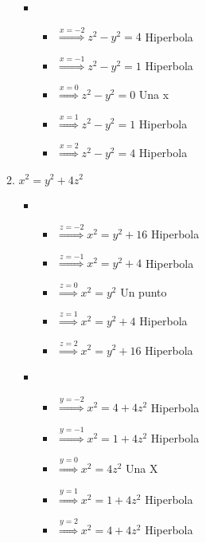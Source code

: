 \documentclass[../practica_02.tex]{subfiles}
\begin{document}
\begin{enumerate}
\begin{enumerate}
\begin{itemize}
                        \item
                            \begin{itemize}
                                \item $\stackrel{x=-2}{\Rightarrow} z^2 - y^2 = 4 $ Hiperbola
                                \item $\stackrel{x=-1}{\Rightarrow} z^2 - y^2 = 1 $ Hiperbola
                                \item $\stackrel{x=0}{\Rightarrow}  z^2 - y^2 = 0 $ Una x
                                \item $\stackrel{x=1}{\Rightarrow}  z^2 - y^2 = 1 $ Hiperbola
                                \item $\stackrel{x=2}{\Rightarrow}  z^2 - y^2 = 4 $ Hiperbola
                            \end{itemize}

                    \end{itemize}

                \item $x^2 = y^2 + 4z^2$

                    \begin{itemize}
                        \item
                            \begin{itemize}
                                \item $\stackrel{z=-2}{\Rightarrow}  x^2 = y^2 + 16 $ Hiperbola
                                \item $\stackrel{z=-1}{\Rightarrow}  x^2 = y^2 + 4  $ Hiperbola
                                \item $\stackrel{z=0}{\Rightarrow}   x^2 = y^2      $ Un punto
                                \item $\stackrel{z=1}{\Rightarrow}   x^2 = y^2 + 4  $ Hiperbola
                                \item $\stackrel{z=2}{\Rightarrow}   x^2 = y^2 + 16 $ Hiperbola
                            \end{itemize}

                        \item
                            \begin{itemize}
                                \item $\stackrel{y=-2}{\Rightarrow} x^2 = 4 + 4z^2 $ Hiperbola
                                \item $\stackrel{y=-1}{\Rightarrow} x^2 = 1 + 4z^2 $ Hiperbola
                                \item $\stackrel{y=0}{\Rightarrow}  x^2 = 4z^2     $ Una X
                                \item $\stackrel{y=1}{\Rightarrow}  x^2 = 1 + 4z^2 $ Hiperbola
                                \item $\stackrel{y=2}{\Rightarrow}  x^2 = 4 + 4z^2 $ Hiperbola
                            \end{itemize}


\end{itemize}
\end{enumerate}
\end{enumerate}
\end{document}
